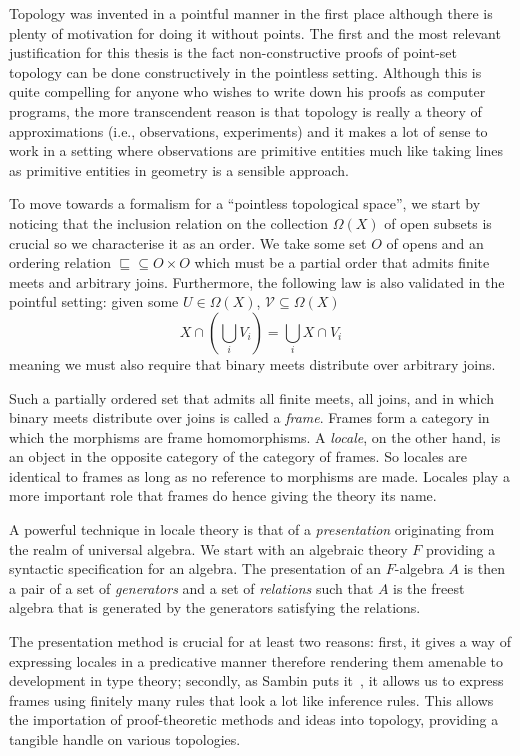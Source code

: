 \documentclass{article}
\begin{document}
Topology was invented in a pointful manner in the first place although there is plenty of
motivation for doing it without points. The first and the most relevant justification for
this thesis is the fact non-constructive proofs of point-set topology can be done
constructively in the pointless setting. Although this is quite compelling for anyone who
wishes to write down his proofs as computer programs, the more transcendent reason is that
topology is really a theory of approximations (i.e., observations, experiments) and it
makes a lot of sense to work in a setting where observations are primitive entities much
like taking lines as primitive entities in geometry is a sensible approach.

To move towards a formalism for a ``pointless topological space'', we start by noticing
that the inclusion relation on the collection $\Omega(X)$ of open subsets is crucial so we
characterise it as an order. We take some set $O$ of opens and an ordering relation $\sqsubseteq \subseteq O
\times O$ which must be a partial order that admits finite meets and arbitrary joins.
Furthermore, the following law is also validated in the pointful setting: given some $U \in
\Omega(X)$, $\mathcal{V} \subseteq \Omega(X)$
\begin{equation*}
  X \cap (\bigcup_{i} V_i) = \bigcup_{i} X \cap V_i
\end{equation*}
meaning we must also require that binary meets distribute over arbitrary joins.

Such a partially ordered set that admits all finite meets, all joins, and in which binary
meets distribute over joins is called a \emph{frame}. Frames form a category in which the
morphisms are frame homomorphisms. A \emph{locale}, on the other hand, is an object in the
opposite category of the category of frames. So locales are identical to frames as long as
no reference to morphisms are made. Locales play a more important role that frames do
hence giving the theory its name.

A powerful technique in locale theory is that of a \emph{presentation} originating from
the realm of universal algebra. We start with an algebraic theory $F$ providing a
syntactic specification for an algebra. The presentation of an $F$-algebra $A$ is then a
pair of a set of \emph{generators} and a set of \emph{relations} such that $A$ is the
freest algebra that is generated by the generators satisfying the relations.

The presentation method is crucial for at least two reasons: first, it gives a way of
expressing locales in a predicative manner therefore rendering them amenable to
development in type theory; secondly, as Sambin puts it~\cite{sambin:2007}, it allows us
to express frames using finitely many rules that look a lot like inference rules. This
allows the importation of proof-theoretic methods and ideas into topology, providing a
tangible handle on various topologies.
\end{document}
